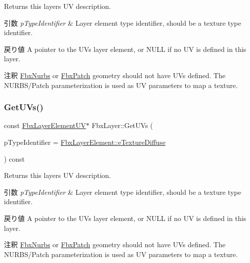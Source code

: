 Returns this layer\textquotesingle{}s UV description. 
\begin{DoxyParams}{引数}
{\em p\+Type\+Identifier} & Layer element type identifier, should be a texture type identifier. \\
\hline
\end{DoxyParams}
\begin{DoxyReturn}{戻り値}
A pointer to the U\+Vs layer element, or {\ttfamily N\+U\+LL} if no UV is defined in this layer. 
\end{DoxyReturn}
\begin{DoxyRemark}{注釈}
\hyperlink{class_fbx_nurbs}{Fbx\+Nurbs} or \hyperlink{class_fbx_patch}{Fbx\+Patch} geometry should not have U\+Vs defined. The N\+U\+R\+B\+S/\+Patch parameterization is used as UV parameters to map a texture. 
\end{DoxyRemark}
\mbox{\label{class_fbx_layer_a734b034b1118084b8420b1a591d64fca}} 
\subsubsection{\texorpdfstring{Get\+U\+Vs()}{GetUVs()}\hspace{0.1cm}{\footnotesize\ttfamily [2/2]}}
{\footnotesize\ttfamily const \hyperlink{class_fbx_layer_element_u_v}{Fbx\+Layer\+Element\+UV}$\ast$ Fbx\+Layer\+::\+Get\+U\+Vs (\begin{DoxyParamCaption}\item[{\hyperlink{class_fbx_layer_element_a8c95c5cd880b56c776acd379bd86f42c}{Fbx\+Layer\+Element\+::\+E\+Type}}]{p\+Type\+Identifier = {\ttfamily \hyperlink{class_fbx_layer_element_a8c95c5cd880b56c776acd379bd86f42ca09829e6ecf512e7ae04d9ad8de1342fa}{Fbx\+Layer\+Element\+::e\+Texture\+Diffuse}} }\end{DoxyParamCaption}) const}

Returns this layer\textquotesingle{}s UV description. 
\begin{DoxyParams}{引数}
{\em p\+Type\+Identifier} & Layer element type identifier, should be a texture type identifier. \\
\hline
\end{DoxyParams}
\begin{DoxyReturn}{戻り値}
A pointer to the U\+Vs layer element, or {\ttfamily N\+U\+LL} if no UV is defined in this layer. 
\end{DoxyReturn}
\begin{DoxyRemark}{注釈}
\hyperlink{class_fbx_nurbs}{Fbx\+Nurbs} or \hyperlink{class_fbx_patch}{Fbx\+Patch} geometry should not have U\+Vs defined. The N\+U\+R\+B\+S/\+Patch parameterization is used as UV parameters to map a texture. 
\end{DoxyRemark}
\mbox{\label{class_fbx_layer_a4aad80bcc55ac82243966ac9ec62856f}} 
